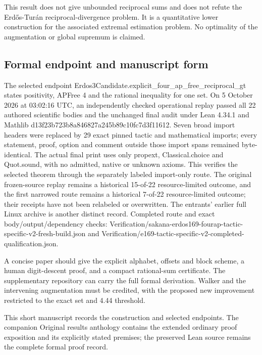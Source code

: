 \documentclass[11pt,a4paper]{article}
\begin{document}
This result does not give unbounded reciprocal sums and does not refute the Erdős-Turán reciprocal-divergence problem. It is a quantitative lower construction for the associated extremal estimation problem. No optimality of the augmentation or global supremum is claimed.

\subsection{Formal endpoint and manuscript form}
The selected endpoint Erdos3Candidate.explicit\_four\_ap\_free\_reciprocal\_gt states positivity, APFree 4 and the rational inequality for one set. On 5 October 2026 at 03:02:16 UTC, an independently checked operational replay passed all 22 authored scientific bodies and the unchanged final audit under Lean 4.34.1 and Mathlib d13f23b723b8a846827a245b89c10fc7d3f11612. Seven broad import headers were replaced by 29 exact pinned tactic and mathematical imports; every statement, proof, option and comment outside those import spans remained byte-identical. The actual final print uses only propext, Classical.choice and Quot.sound, with no admitted, native or unknown axioms. This verifies the selected theorem through the separately labeled import-only route. The original frozen-source replay remains a historical 15-of-22 resource-limited outcome, and the first narrowed route remains a historical 7-of-22 resource-limited outcome; their receipts have not been relabeled or overwritten. The entrants' earlier full Linux archive is another distinct record. Completed route and exact body/output/dependency checks: Verification/sakana-erdos169-fourap-tactic-specific-v2-fresh-build.json and Verification/e169-tactic-specific-v2-completed-qualification.json.

A concise paper should give the explicit alphabet, offsets and block scheme, a human digit-descent proof, and a compact rational-sum certificate. The supplementary repository can carry the full formal derivation. Walker and the intervening augmentation must be credited, with the proposed new improvement restricted to the exact set and 4.44 threshold.

{\small This short manuscript records the construction and selected endpoints. The companion Original results anthology contains the extended ordinary proof exposition and its explicitly stated premises; the preserved Lean source remains the complete formal proof record.\par}
\end{document}
